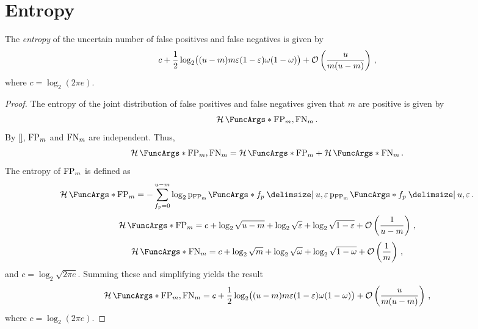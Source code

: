\documentclass[ ../main.tex]{subfiles}
\begin{document}
\section{Entropy}
\label{sec:entropy}
\begin{theorem}
The \emph{entropy} of the uncertain number of false positives and false negatives is given by
\begin{equation}
    c + \frac{1}{2} \log_2\!\left((u - m)m\varepsilon(1 - \varepsilon)\omega(1-\omega)\right) + \mathcal{O}\left(\frac{u}{m(u - m)}\right)\,,
\end{equation}
where $c = \log_2(2 \pi e)$.
\end{theorem}
\begin{proof}
The entropy of the joint distribution of false positives and false negatives given that $m$ are positive is given by
\begin{equation}
    \Entropy{\FP_m, \FN_m}\,.
\end{equation}
By \cref{}, $\mathrm{FP}_m$ and $\mathrm{FN}_m$ are independent. Thus,
\begin{equation}
    \Entropy{\FP_m,\FN_m} = \Entropy{\FP_m} + \Entropy{\FN_m}\,.
\end{equation}
The entropy of $\mathrm{FP}_m$ is defined as
\begin{equation}
    \Entropy{\FP_m} = -\sum_{f_p = 0}^{u - m} \log_2 \PDF{f_p \Given u, \fprate}[\FP_m] \PDF{f_p \Given u, \fprate}[\FP_m]\,.
\end{equation}
\begin{equation}
    \Entropy{\FP_m} = c + \log_2 \sqrt{u - m} + \log_2 \sqrt{\fprate} + \log_2 \sqrt{1 - \fprate} + \mathcal{O}\left(\frac{1}{u - m}\right)\,,
\end{equation}
\begin{equation}
    \Entropy{\FN_m} = c + \log_2 \sqrt{m} + \log_2 \sqrt{\fnrate} + \log_2 \sqrt{1 - \fnrate} + \mathcal{O}\left(\frac{1}{m}\right)\,,
\end{equation}
and $c = \log_2 \sqrt{2 \pi e}$. Summing these and simplifying yields the result
\begin{equation}
    \Entropy{\FP_m, \FN_m} = c + \frac{1}{2} \log_2\!\left((u - m)m\fprate(1 - \fprate)\fnrate(1-\fnrate)\right) + \mathcal{O}\left(\frac{u}{m(u - m)}\right)\,,
\end{equation}
where $c = \log_2(2 \pi e)$.
\end{proof}
\end{document}
